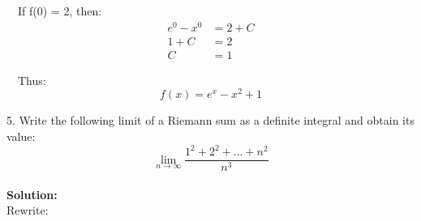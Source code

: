 \documentclass{article}
\begin{document}
\,\,\,\, If f(0) = 2, then:
\begin{align*}
    e^0-x^0  &= 2 + C \\
    1 + C  &= 2 \\
    C &= 1
\end{align*}

\,\,\,\, Thus: \[f(x) = e^x-x^2+1\]

5. Write the following limit of a Riemann sum as a definite integral and obtain its value:
\[\lim_{n \rightarrow \infty} \frac{1^2+2^2+\text{...}+n^2}{n^3}\]
\\
\textbf{Solution:}\\
Rewrite:
\end{document}
